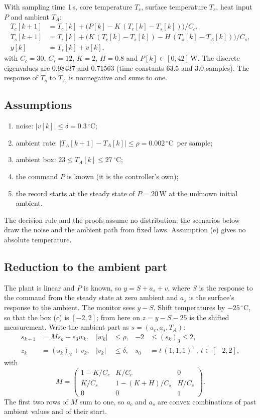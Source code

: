 \documentclass[11pt,a4paper]{article}
\newcommand{\degC}{\ensuremath{{}^\circ}C}
\begin{document}
With sampling time 1\,s, core temperature $T_c$, surface temperature $T_s$, heat input $P$ and ambient $T_A$:
\begin{align*}
T_c[k+1] &= T_c[k] + \bigl(P[k] - K\,(T_c[k]-T_s[k])\bigr)/C_c,\\
T_s[k+1] &= T_s[k] + \bigl(K\,(T_c[k]-T_s[k]) - H\,(T_s[k]-T_A[k])\bigr)/C_s,\\
y[k] &= T_s[k] + v[k],
\end{align*}
with $C_c = 30$, $C_s = 12$, $K = 2$, $H = 0.8$ and $P[k]\in[0,42]$\,W. The discrete eigenvalues are 0.98437 and
0.71563 (time constants 63.5 and 3.0 samples). The response of $T_s$ to $T_A$ is nonnegative and sums to one.

\subsection{Assumptions}

\begin{enumerate}[label=(\alph*)]
\item noise: $|v[k]|\le\delta = 0.3$\,\degC;
\item ambient rate: $|T_A[k+1]-T_A[k]|\le\rho = 0.002$\,\degC\ per sample;
\item ambient box: $23\le T_A[k]\le 27$\,\degC;
\item the command $P$ is known (it is the controller's own);
\item the record starts at the steady state of $P = 20$\,W at the unknown initial ambient.
\end{enumerate}
The decision rule and the proofs assume no distribution; the scenarios below draw the noise and the ambient path
from fixed laws. Assumption (e) gives no absolute temperature.

\subsection{Reduction to the ambient part}\label{sec:reduce}

The plant is linear and $P$ is known, so $y = S + a_s + v$, where $S$ is the response to the command from the steady
state at zero ambient and $a_s$ is the surface's response to the ambient. The monitor sees $y - S$. Shift
temperatures by $-25$\,\degC, so that the box (c) is $[-2,2]$; from here on $z = y - S - 25$ is the shifted
measurement. Write the ambient part as $s = (a_c, a_s, T_A)$:
\begin{align*}
s_{k+1} &= M s_k + e_3 w_k, & |w_k|&\le\rho, & -2 &\le (s_k)_3\le 2,\\
z_k &= (s_k)_2 + v_k, & |v_k|&\le\delta, & s_0 &= t\,(1,1,1)^\top,\ t\in[-2,2],
\end{align*}
with
\[
M = \begin{pmatrix} 1-K/C_c & K/C_c & 0\\ K/C_s & 1-(K+H)/C_s & H/C_s\\ 0 & 0 & 1\end{pmatrix}.
\]
The first two rows of $M$ sum to one, so $a_c$ and $a_s$ are convex combinations of past ambient values and of their
start.
\end{document}
